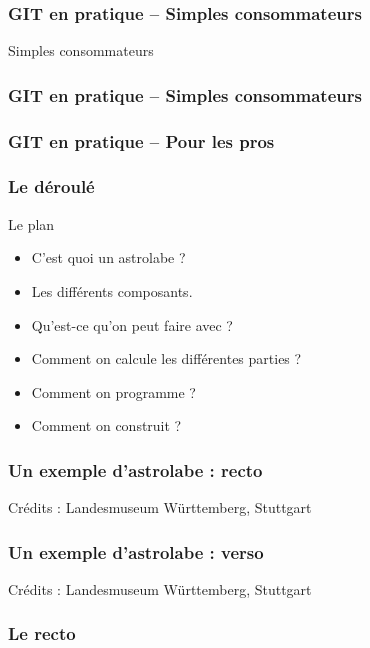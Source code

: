 \documentclass{beamer}
\begin{document}
\begin{frame}\frametitle{GIT en pratique -- Simples consommateurs }
Simples consommateurs
\begin{center}
\hglue -1cm 
\end{center}

\end{frame}

\begin{frame}\frametitle{GIT en pratique -- Simples consommateurs}
\begin{center}
\hglue -1cm 
\end{center}

   \end{frame}
   
   \begin{frame}\frametitle{GIT en pratique -- Pour les pros}
\begin{center}
\hglue -2cm 
\end{center}

   \end{frame}
   
   
   


\begin{frame}\frametitle{Le déroulé}
\begin{block}{Le plan}
\begin{itemize}
\item C'est quoi un astrolabe ?
\item Les différents composants. 
\item Qu'est-ce qu'on peut faire avec ? 
\item Comment on calcule les différentes parties ? 
\item Comment on programme ? 
\item Comment on construit ?

\end{itemize}
\end{block}

   \end{frame}
   
\begin{frame}\frametitle{Un exemple d'astrolabe : recto}
\begin{center}
\end{center}
{\hfill Crédits : Landesmuseum Württemberg, Stuttgart}



   \end{frame}
   
   \begin{frame}\frametitle{Un exemple d'astrolabe : verso}
\begin{center}
\end{center}
{\hfill Crédits : Landesmuseum Württemberg, Stuttgart}
   \end{frame}
   
\begin{frame}\frametitle{Le recto}


   \end{frame}
   
\begin{frame}\frametitle{}

   \end{frame}
 
\end{document}
